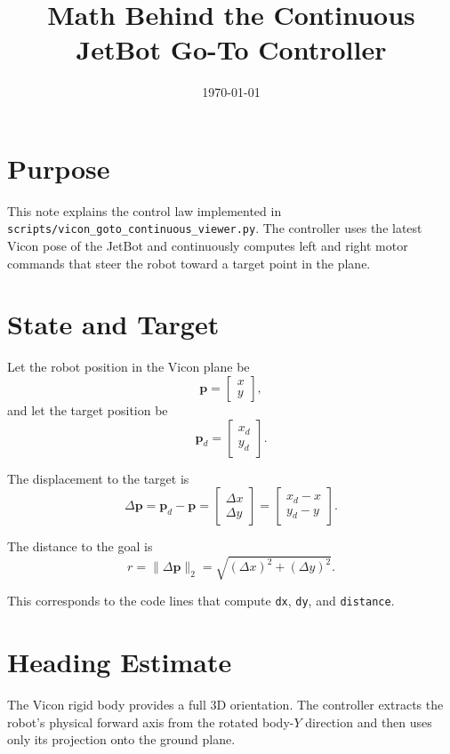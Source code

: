 \documentclass[11pt]{article}
\title{Math Behind the Continuous JetBot Go-To Controller}
\author{}
\date{\today}
\begin{document}
\maketitle

\section{Purpose}

This note explains the control law implemented in
\texttt{scripts/vicon\_goto\_continuous\_viewer.py}. The controller uses the
latest Vicon pose of the JetBot and continuously computes left and right motor
commands that steer the robot toward a target point in the plane.

\section{State and Target}

Let the robot position in the Vicon plane be
\[
\mathbf{p} =
\begin{bmatrix}
x \\
y
\end{bmatrix},
\]
and let the target position be
\[
\mathbf{p}_d =
\begin{bmatrix}
x_d \\
y_d
\end{bmatrix}.
\]

The displacement to the target is
\[
\Delta \mathbf{p} =
\mathbf{p}_d - \mathbf{p}
=
\begin{bmatrix}
\Delta x \\
\Delta y
\end{bmatrix}
=
\begin{bmatrix}
x_d - x \\
y_d - y
\end{bmatrix}.
\]

The distance to the goal is
\[
r = \lVert \Delta \mathbf{p} \rVert_2
= \sqrt{(\Delta x)^2 + (\Delta y)^2}.
\]

This corresponds to the code lines that compute
\texttt{dx}, \texttt{dy}, and \texttt{distance}.

\section{Heading Estimate}

The Vicon rigid body provides a full 3D orientation. The controller extracts
the robot's physical forward axis from the rotated body-$Y$ direction and then
uses only its projection onto the ground plane.
\end{document}
